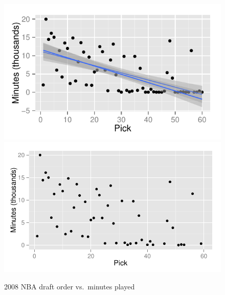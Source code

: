 \documentclass[letterpaper, landscape]{exam}
\begin{document}
\begin{questions}
          

      
      \ifprintanswers{}
      \else
        \newpage
      \fi

      \question{}\label{q:draft}

        \begin{figure}[H]
          \centering
          \ifprintanswers{}
            \includegraphics[scale = 0.8]{figures/draft_with_regression.pdf}
          \else
            \includegraphics[scale = 0.8]{figures/draft.pdf}
          \fi
          \caption{2008 NBA draft order vs.\ minutes played}\label{fig:draft}
        \end{figure}


\end{questions}
\end{document}
